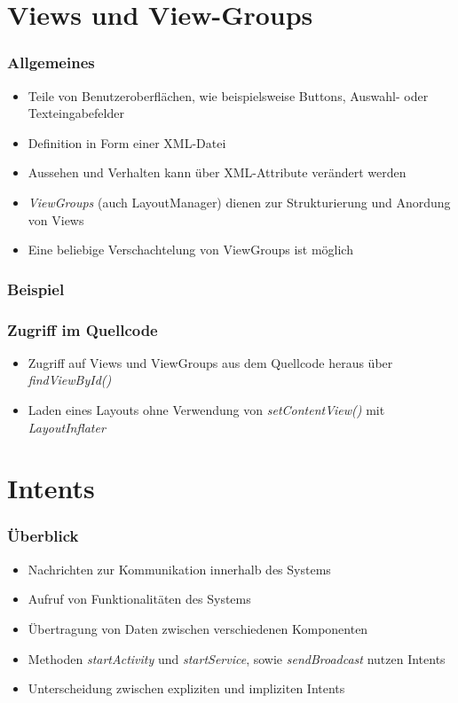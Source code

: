 \section{Views und View-Groups}
\begin{frame}[label=views]
   \frametitle{Allgemeines}
   \begin{itemize}
      \item Teile von Benutzeroberflächen, wie beispielsweise Buttons, Auswahl- 
         oder Texteingabefelder
      \item Definition in Form einer XML-Datei
      \item Aussehen und Verhalten kann über XML-Attribute verändert werden
      \item \emph{ViewGroups} (auch LayoutManager) dienen zur Strukturierung und Anordung 
         von Views
      \item Eine beliebige Verschachtelung von ViewGroups ist möglich
   \end{itemize}
\end{frame}

\begin{frame}[label=access_views]
   \frametitle{Beispiel}

   
\end{frame}

\begin{frame}[label=access_views]
   \frametitle{Zugriff im Quellcode}
   \begin{itemize}
      \item Zugriff auf Views und ViewGroups aus dem Quellcode heraus über \emph{findViewById()}
      \item Laden eines Layouts ohne Verwendung von \emph{setContentView()} mit \emph{LayoutInflater}
   \end{itemize}

   
\end{frame}

\section{Intents}
\begin{frame}[label=intents]
   \frametitle{Überblick}
   \begin{itemize}
      \item Nachrichten zur Kommunikation innerhalb des Systems
      \item Aufruf von Funktionalitäten des Systems
      \item Übertragung von Daten zwischen verschiedenen Komponenten
      \item Methoden \emph{startActivity} und \emph{startService}, sowie 
         \emph{sendBroadcast} nutzen Intents
      \item Unterscheidung zwischen expliziten und impliziten Intents
   \end{itemize}
\end{frame}

